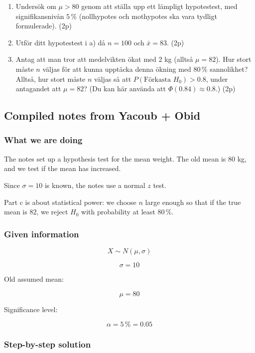 \documentclass[10pt]{article}
\begin{document}
\begin{enumerate}[label=\alph*)]
\item
Undersök om $\mu>80$ genom att ställa upp ett lämpligt hypotestest,
med signifikansnivån $5\,\%$ (nollhypotes och mothypotes ska vara
tydligt formulerade).
\hfill (2p)

\item
Utför ditt hypotestest i a) då $n=100$ och $\bar{x}=83$.
\hfill (2p)

\item
Antag att man tror att medelvikten ökat med 2 kg
(alltså $\mu=82$). Hur stort måste $n$ väljas för att kunna
upptäcka denna ökning med $80\,\%$ sannolikhet?
Alltså, hur stort måste $n$ väljas så att
$P(\text{Förkasta }H_0)>0.8$, under antagandet att $\mu=82$?
(Du kan här använda att $\Phi(0.84)\approx 0.8$.)
\hfill (2p)
\end{enumerate}

\subsection*{Compiled notes from Yacoub + Obid}

\subsubsection*{What we are doing}
The notes set up a hypothesis test for the mean weight.
The old mean is $80$ kg, and we test if the mean has increased.

Since $\sigma=10$ is known, the notes use a normal $z$ test.

Part c is about statistical power:
we choose $n$ large enough so that if the true mean is $82$,
we reject $H_0$ with probability at least $80\,\%$.

\subsubsection*{Given information}
\[
X\sim N(\mu,\sigma)
\]

\[
\sigma=10
\]

Old assumed mean:

\[
\mu=80
\]

Significance level:

\[
\alpha=5\,\%=0.05
\]

\subsubsection*{Step-by-step solution}
\end{document}
